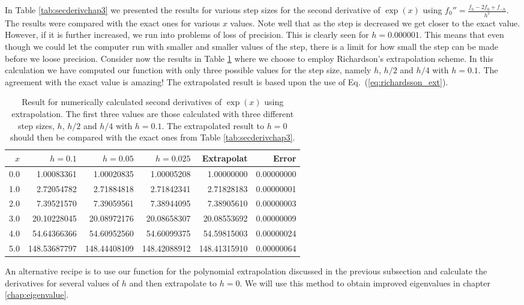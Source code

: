 In Table \ref{tab:secderivchap3}
we presented the results for various step sizes for the second
derivative  of $\exp{(x)}$ using 
$f_0''=\frac{ f_h -2f_0 +f_{-h}}{h^2}$. The results were 
compared with the exact ones for various $x$ values.
Note well that as the step is decreased we get closer to the exact value. However,
if it is further increased, we run into problems of loss of precision. This is clearly seen
for $h=0.000001$.
This means that even though we could let the computer run with smaller and smaller
values of the step, there is a limit for how small the step can be made before we
loose precision. 
Consider now the results in Table \ref{tab:richardson} 
where we choose to employ
Richardson's extrapolation scheme. In this calculation we have 
computed our function with only three possible values for the step size, namely $h$, $h/2$ and $h/4$
with $h=0.1$. The agreement with the exact value is amazing! 
The extrapolated result is based upon the use of Eq.~(\ref{eq:richardsson_ext}).
\begin{table}[hbtp]
\begin{center}
\begin{tabular}{rrrrrr}\hline
$x$&$h=0.1$&$h=0.05$&$h=0.025$&Extrapolat&Error \\\hline
  0.0& 1.00083361 &   1.00020835  &  1.00005208  &  1.00000000  &  0.00000000    \\
 1.0&  2.72054782  &  2.71884818  &  2.71842341  &  2.71828183  &  0.00000001   \\
 2.0&  7.39521570  &  7.39059561  &  7.38944095  &  7.38905610  &  0.00000003    \\
 3.0&   20.10228045 &  20.08972176 &  20.08658307 &  20.08553692 &   0.00000009  \\ 
 4.0&    54.64366366 &  54.60952560 &  54.60099375 &  54.59815003 &   0.00000024  \\
 5.0&   148.53687797&  148.44408109 & 148.42088912 & 148.41315910  &  0.00000064 \\\hline
\end{tabular}  
\caption{Result  for numerically calculated second derivatives of $\exp{(x)}$ using
         extrapolation. The first three values are those calculated with three different
         step sizes, $h$, $h/2$ and $h/4$ with $h=0.1$. The extrapolated result to $h=0$
         should then be compared with the exact ones from Table \ref{tab:secderivchap3}. \label{tab:richardson}} 
\end{center}  
\end{table}     
An alternative recipe is to use our function for the polynomial extrapolation discussed in the previous
subsection and calculate the derivatives for several values of $h$ and then extrapolate to $h=0$.
We will use this method to obtain improved eigenvalues in chapter \ref{chap:eigenvalue}.


